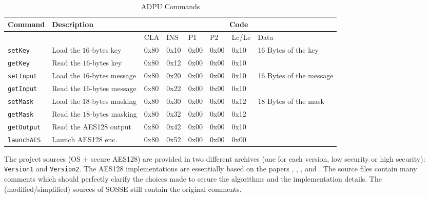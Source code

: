 \documentclass{article}
\begin{document}
\begin{table}[H]
	\centering
	\begin{tabular}{l|l|llllll}
	Command              & Description                     & \multicolumn{6}{c}{Code}  \\
	\hline                                                  
	                      &                                 & CLA & INS & P1  & P2  & Lc/Le & Data              \\
	\hline
	\texttt{setKey}       & Load the $16$-bytes key   & 0x80& 0x10& 0x00& 0x00& 0x10  & 16 Bytes of the key    \\
	\texttt{getKey}       & Read the $16$-bytes key       & 0x80& 0x12& 0x00& 0x00& 0x10  &                      \\
	\texttt{setInput}     & Load the $16$-bytes message & 0x80& 0x20& 0x00& 0x00& 0x10  & 16 Bytes of the message \\
	\texttt{getInput}     & Read the $16$-bytes message    & 0x80& 0x22& 0x00& 0x00& 0x10  &                      \\
	\texttt{setMask}      & Load the $18$-bytes masking   & 0x80& 0x30& 0x00& 0x00& 0x12  & 18 Bytes of the mask  \\
	\texttt{getMask}      & Read the $18$-bytes masking       & 0x80& 0x32& 0x00& 0x00& 0x12  &                      \\
	\texttt{getOutput}    & Read the AES128 output   & 0x80& 0x42& 0x00& 0x00& 0x10  &                      \\
	\texttt{launchAES}    & Launch AES128 enc.   & 0x80& 0x52& 0x00& 0x00& 0x00  &                      \\
	\end{tabular}
	\caption{ADPU Commands}
	\label{table:apduCommands}
\end{table}

The project sources (OS + secure AES128) are provided in two different archives (one for each version, low security or high security): \texttt{Version1} and \texttt{Version2}. The AES128 implementations are essentially based on the papers \cite{AG01}, \cite{CJRR99}, \cite{FMPR10}, \cite{Wil01} and \cite{RPD09}. The source files contain many comments which should perfectly clarify the choices made to secure the algorithms and the implementation details. The (modified/simplified) sources of SOSSE still contain the original comments.








\end{document}
